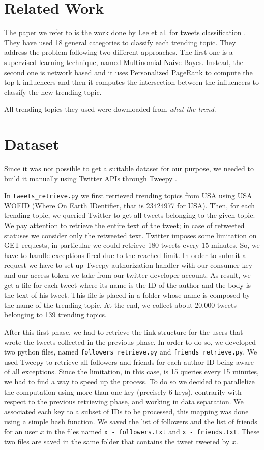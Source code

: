 \documentclass[journal,11pt]{vgtc}
\begin{document}
\section{Related Work}
The paper we refer to is the work done by Lee et al. for tweets classification \cite{lee_palsetia_narayanan_patwary_agrawal_choudhary_2011}.
They have used 18 general categories to classify each trending topic.
They address the problem following two different approaches. The first one is a supervised learning technique, named
Multinomial Naive Bayes. Instead, the second one is network based and it uses Personalized PageRank to compute the
top-k influencers and then it computes the intersection between the influencers to classify the new trending topic.

All trending topics they used were downloaded from \textit{what the trend}.

\section{Dataset}
Since it was not possible to get a suitable dataset for our purpose, we needed to build it manually
using Twitter APIs \cite{twitter} through Tweepy \cite{api}.

In \texttt{tweets\_retrieve.py} we
first retrieved trending topics from USA using USA WOEID (Where On Earth IDentifier, that is 23424977 for USA).
Then, for each trending topic, we queried Twitter to get all tweets belonging to the given topic.
We pay attention to retrieve the entire text of the tweet; in case of retweeted statuses we consider only the
retweeted text.
Twitter imposes some limitation on GET requests, in particular we could retrieve 180 tweets every 15 minutes.
So, we have to handle exceptions fired due to the reached limit.
In order to submit a request we have to set up Tweepy authorization handler with our
consumer key and our access token we take from our twitter developer account.
As result, we get a file for each tweet where its name is the ID of the author and the body is the text of his tweet.
This file is placed in a folder whose name is composed by the name of the trending topic.
At the end, we collect about 20.000 tweets belonging to 139 trending topics.

After this first phase, we had to retrieve the link structure for the users that wrote the tweets collected
in the previous phase. In order to do so, we developed two python files, named \texttt{followers\_retrieve.py} and
\texttt{friends\_retrieve.py}.
We used Tweepy to retrieve all followers and friends for each author ID being aware of all exceptions.
Since the limitation, in this case, is 15 queries every 15 minutes, we had to find a way to speed up the process.
To do so we decided to parallelize the computation using more than one key (precisely 6 keys), contrarily with respect to the previous
retrieving phase, and working in data separation. We associated each key to a subset of IDs to be processed, this
mapping was done using a simple hash function.
We saved the list of followers and the list of friends for an user $x$ in the files named \texttt{x - followers.txt}
and \texttt{x - friends.txt}. These two files are saved in the same folder that contains the tweet tweeted by $x$.
\end{document}
